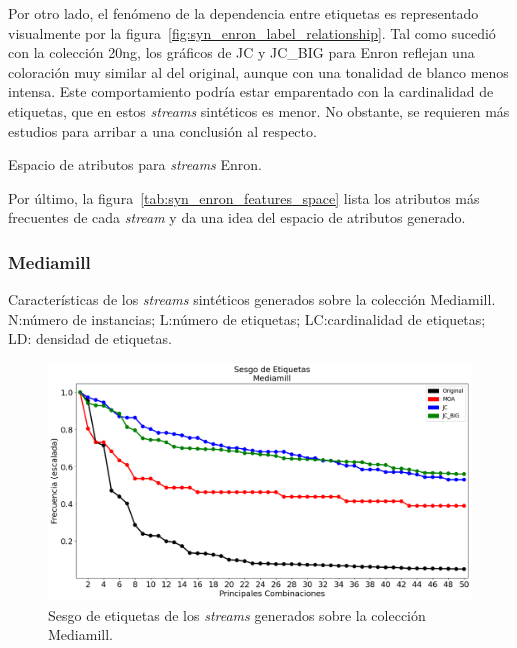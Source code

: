 Por otro lado, el fenómeno de la dependencia entre etiquetas es representado
visualmente por la figura~\ref{fig:syn_enron_label_relationship}. Tal como
sucedió con la colección 20ng, los gráficos de JC y JC\_BIG para Enron reflejan
una coloración muy similar al del original, aunque con una tonalidad de blanco
menos intensa. Este comportamiento podría estar emparentado con la cardinalidad
de etiquetas, que en estos \textit{streams} sintéticos es menor. No obstante, se
requieren más estudios para arribar a una conclusión al respecto.

\begin{table}[htbp]
	\centering
	\begin{adjustbox}{max width=\textwidth}
		
	\end{adjustbox}
	\caption{Espacio de atributos para \textit{streams} Enron.}
	\label{tab:syn_enron_features_space}
\end{table}

Por último, la figura~\ref{tab:syn_enron_features_space} lista los atributos más
frecuentes de cada \textit{stream} y da una idea del espacio de atributos
generado.

\subsubsection{Mediamill}

\begin{table}[htbp]
	\centering
	\begin{adjustbox}{max width=\textwidth}
		
	\end{adjustbox}
	\caption[Características de los \textit{streams} sintéticos generados sobre
		la colección Mediamill.]{Características de los \textit{streams}
		sintéticos generados sobre la colección Mediamill.  N:\@ número de
		instancias; L:\@ número de etiquetas; LC:\@ cardinalidad de etiquetas; LD:\@
		densidad de etiquetas.}
	\label{tab:syn_mediamill_stats}
\end{table}

\begin{figure}[htbp]
	\includegraphics[width=\linewidth]{figures/experiments/syn/mediamill/label_skew.png}
	\caption{Sesgo de etiquetas de los \textit{streams} generados sobre la
		colección Mediamill.}
	\label{fig:syn_mediamill_label_skew}
\end{figure}

